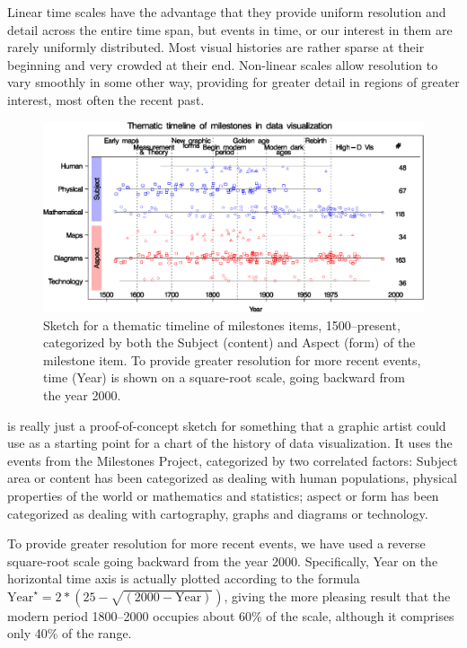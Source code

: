 Linear time scales have the advantage that they
provide uniform resolution and detail across the entire time span, but events in time, or our interest in them are rarely uniformly distributed. Most visual histories are rather sparse at their beginning and very
crowded at their end.
Non-linear scales allow resolution to vary smoothly in some other way, providing for greater detail
in regions of greater interest, most often the recent past.


\begin{figure}[!htb]
  \centering
  \includegraphics[width=\textwidth,clip]{fig/milecatline}
  \caption{Sketch for a thematic timeline of milestones items, 1500--present,
  categorized by both the Subject (content)
  and Aspect (form) of the milestone item.  To provide greater resolution for more recent events,
  time (Year) is shown on a square-root scale, going backward from the year 2000.
  }
  \label{fig:milecatline}
\end{figure}

 is really just a proof-of-concept sketch for something that a graphic artist
could use as a starting point for a chart of
the history of data visualization. It uses the events from the
Milestones Project, categorized by two correlated factors: 
Subject area or content has been
categorized as dealing with human populations, physical properties of the world or
mathematics and statistics; aspect or form has been categorized as dealing with
cartography, graphs and diagrams or technology. 

To provide greater resolution for more recent events, we have used a reverse square-root
scale going backward from the year 2000. Specifically, Year on the horizontal time axis
is actually plotted according to the formula $\textrm{Year}^\star = 2* (25 - \sqrt{(2000 - \textrm{Year})})$,
giving the more pleasing result that the modern period 1800--2000 occupies about 60\% of the scale,
although it comprises only 40\% of the range.

